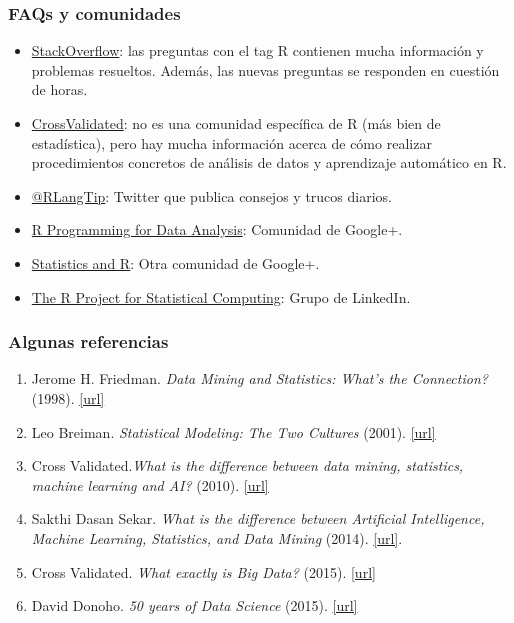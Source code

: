 \documentclass{beamer}
\begin{document}
\begin{frame}
\frametitle{FAQs y comunidades}
\begin{itemize}
\item \href{http://stackoverflow.com/questions/tagged/r}{StackOverflow}: las preguntas con el tag R contienen mucha información y problemas resueltos. Además, las nuevas preguntas se responden en cuestión de horas.

\item \href{http://stats.stackexchange.com/}{CrossValidated}: no es una comunidad específica de R (más bien de estadística), pero hay mucha información acerca de cómo realizar procedimientos concretos de análisis de datos y aprendizaje automático en R.

\item \href{https://twitter.com/RLangTip}{@RLangTip}: Twitter que publica consejos y trucos diarios.

\item \href{https://plus.google.com/u/0/communities/115516770321395255377}{R Programming for Data Analysis}: Comunidad de Google+.
\item \href{https://plus.google.com/u/0/communities/117681470673972651781}{Statistics and R}: Otra comunidad de Google+.
\item \href{https://www.linkedin.com/grp/home?gid=77616}{The R Project for Statistical Computing}: Grupo de LinkedIn.
\end{itemize}
\end{frame}

\begin{frame}
\frametitle{Algunas referencias}
\begin{enumerate}
\item Jerome H. Friedman. \textit{Data Mining and Statistics: What's the Connection?} (1998). \href{http://statweb.stanford.edu/~jhf/ftp/dm-stat.pdf}{[url]}
\item Leo Breiman. \textit{Statistical Modeling: The Two Cultures} (2001). \href{http://projecteuclid.org/download/pdf_1/euclid.ss/1009213726}{[url]}
\item Cross Validated.\textit{What is the difference between data mining, statistics, machine learning and AI?} (2010). \href{http://stats.stackexchange.com/questions/5026/what-is-the-difference-between-data-mining-statistics-machine-learning-and-ai}{[url]}
\item Sakthi Dasan Sekar. \textit{What is the difference between Artificial Intelligence, Machine Learning, Statistics, and Data Mining} (2014). \href{http://shakthydoss.com/what-is-the-difference-between-artificial-intelligence-machine-learning-statistics-and-data-mining/}{[url]}.
\item Cross Validated. \textit{What exactly is Big Data?} (2015). \href{http://stats.stackexchange.com/questions/173060/what-exactly-is-big-data}{[url]}
\item David Donoho. \textit{50 years of Data Science} (2015). \href{http://pages.cs.wisc.edu/~anhai/courses/784-fall15/50YearsDataScience.pdf}{[url]}
\end{enumerate}
\end{frame}
\end{document}
